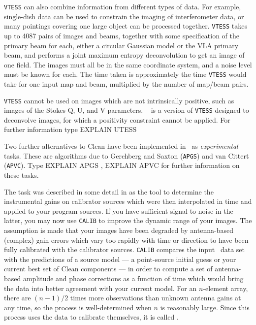      {\tt VTESS} can also combine information from different types of
data.  For example, single-dish data can be used to constrain the
imaging of interferometer data, or many pointings covering one large
object can be processed together.  {\tt VTESS} takes up to 4087 pairs
of images and beams, together with some specification of the primary
beam for each, either a circular Gaussian model or the VLA primary
beam, and performs a joint maximum entropy deconvolution to get an
image of one field.  The images must all be in the same coordinate
system, and a noise level must be known for each.  The time taken is
approximately the time {\tt VTESS} would take for one input map and
beam, multiplied by the number of map/beam pairs.

     {\tt VTESS} cannot be used on images which are not intrinsically
positive, such as images of the Stokes Q, U, and V parameters.  {\tt
{}} is a version of {\tt VTESS} designed to deconvolve
 images, for which a positivity constraint cannot
be applied.  For further information type {\us EXPLAIN UTESS \CR}\@

      Two further alternatives to Clean have been implemented in
\AIPS\ as {\it experimental\/} tasks.  These are algorithms due to
Gerchberg and Saxton ({\tt APGS}) and van Cittert ({\tt APVC}).  Type
{\us EXPLAIN APGS \CR}, {\us EXPLAIN APVC \CR} for further information
on these tasks.


       The task {\tt {}} was
described in some detail in  as the tool to determine the
instrumental gains on calibrator sources which were then interpolated
in time and applied to your program sources.  If you have sufficient
signal to noise in the latter, you may now use {\tt CALIB} to improve
the dynamic range of your images.  The assumption is made that your
images have been degraded by antenna-based (complex) gain errors which
vary too rapidly with time or direction to have been fully calibrated
with the calibrator sources. {\tt CALIB} compares the input \uv\ data
set with the predictions of a source model --- a point-source initial
guess or your current best set of Clean components --- in order to
compute a set of antenna-based amplitude and phase corrections as a
function of time which would bring the data into better agreement with
your current model.  For an $n$-element array, there are $ (n-1) / 2$
times more observations than unknown antenna gains at any time, so the
process is well-determined when $n$ is reasonably large.  Since this
process uses the data to calibrate themselves, it is called
.

